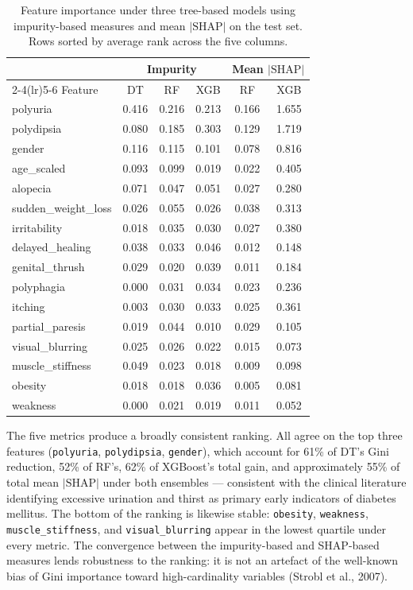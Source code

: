 \documentclass[11pt]{article}
\begin{document}
\begin{table}[H]
\centering
\small
\caption{Feature importance under three tree-based models using
impurity-based measures and mean $|\text{SHAP}|$ on the test set.
Rows sorted by average rank across the five columns.}
\label{tab:importance}
\begin{tabular}{lccccc}
\toprule
 & \multicolumn{3}{c}{Impurity} & \multicolumn{2}{c}{Mean $|\text{SHAP}|$} \\
\cmidrule(lr){2-4}\cmidrule(lr){5-6}
Feature & DT & RF & XGB & RF & XGB \\
\midrule
polyuria            & 0.416 & 0.216 & 0.213 & 0.166 & 1.655 \\
polydipsia          & 0.080 & 0.185 & 0.303 & 0.129 & 1.719 \\
gender              & 0.116 & 0.115 & 0.101 & 0.078 & 0.816 \\
age\_scaled         & 0.093 & 0.099 & 0.019 & 0.022 & 0.405 \\
alopecia            & 0.071 & 0.047 & 0.051 & 0.027 & 0.280 \\
sudden\_weight\_loss & 0.026 & 0.055 & 0.026 & 0.038 & 0.313 \\
irritability        & 0.018 & 0.035 & 0.030 & 0.027 & 0.380 \\
delayed\_healing    & 0.038 & 0.033 & 0.046 & 0.012 & 0.148 \\
genital\_thrush     & 0.029 & 0.020 & 0.039 & 0.011 & 0.184 \\
polyphagia          & 0.000 & 0.031 & 0.034 & 0.023 & 0.236 \\
itching             & 0.003 & 0.030 & 0.033 & 0.025 & 0.361 \\
partial\_paresis    & 0.019 & 0.044 & 0.010 & 0.029 & 0.105 \\
visual\_blurring    & 0.025 & 0.026 & 0.022 & 0.015 & 0.073 \\
muscle\_stiffness   & 0.049 & 0.023 & 0.018 & 0.009 & 0.098 \\
obesity             & 0.018 & 0.018 & 0.036 & 0.005 & 0.081 \\
weakness            & 0.000 & 0.021 & 0.019 & 0.011 & 0.052 \\
\bottomrule
\end{tabular}
\end{table}

The five metrics produce a broadly consistent ranking. All agree on
the top three features (\texttt{polyuria}, \texttt{polydipsia},
\texttt{gender}), which account for 61\% of DT's Gini reduction, 52\%
of RF's, 62\% of XGBoost's total gain, and approximately 55\% of total
mean $|\text{SHAP}|$ under both ensembles --- consistent with the
clinical literature identifying excessive urination and thirst as
primary early indicators of diabetes mellitus. The bottom of the
ranking is likewise stable: \texttt{obesity}, \texttt{weakness},
\texttt{muscle\_stiffness}, and \texttt{visual\_blurring} appear in the
lowest quartile under every metric. The convergence between the
impurity-based and SHAP-based measures lends robustness to the ranking:
it is not an artefact of the well-known bias of Gini importance toward
high-cardinality variables (Strobl et al., 2007).
\end{document}

